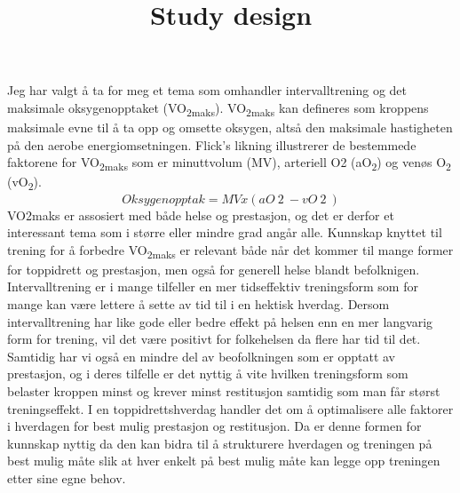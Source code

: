 \documentclass[
  letterpaper,
  DIV=11,
  numbers=noendperiod]{scrartcl}
\title{Study design}
\author{}
\date{}
\begin{document}
\maketitle
\ifdefined\Shaded\renewenvironment{Shaded}{\begin{tcolorbox}[frame hidden, boxrule=0pt, interior hidden, breakable, enhanced, borderline west={3pt}{0pt}{shadecolor}, sharp corners]}{\end{tcolorbox}}\fi

Jeg har valgt å ta for meg et tema som omhandler intervalltrening og det
maksimale oksygenopptaket (VO\textsubscript{2maks}).
VO\textsubscript{2maks} kan defineres som kroppens maksimale evne til å
ta opp og omsette oksygen, altså den maksimale hastigheten på den aerobe
energiomsetningen. Flick's likning illustrerer de bestemmede faktorene
for VO\textsubscript{2maks} som er minuttvolum (MV), arteriell O2
(aO\textsubscript{2}) og venøs O\textsubscript{2} (vO\textsubscript{2}).
\[Oksygenopptak = MV x (aO~2~ - vO~2~)\] VO2maks er assosiert med både
helse og prestasjon, og det er derfor et interessant tema som i større
eller mindre grad angår alle. Kunnskap knyttet til trening for å
forbedre VO\textsubscript{2maks} er relevant både når det kommer til
mange former for toppidrett og prestasjon, men også for generell helse
blandt befolknigen. Intervalltrening er i mange tilfeller en mer
tidseffektiv treningsform som for mange kan være lettere å sette av tid
til i en hektisk hverdag. Dersom intervalltrening har like gode eller
bedre effekt på helsen enn en mer langvarig form for trening, vil det
være positivt for folkehelsen da flere har tid til det. Samtidig har vi
også en mindre del av beofolkningen som er opptatt av prestasjon, og i
deres tilfelle er det nyttig å vite hvilken treningsform som belaster
kroppen minst og krever minst restitusjon samtidig som man får størst
treningseffekt. I en toppidrettshverdag handler det om å optimalisere
alle faktorer i hverdagen for best mulig prestasjon og restitusjon. Da
er denne formen for kunnskap nyttig da den kan bidra til å strukturere
hverdagen og treningen på best mulig måte slik at hver enkelt på best
mulig måte kan legge opp treningen etter sine egne behov.
\end{document}
